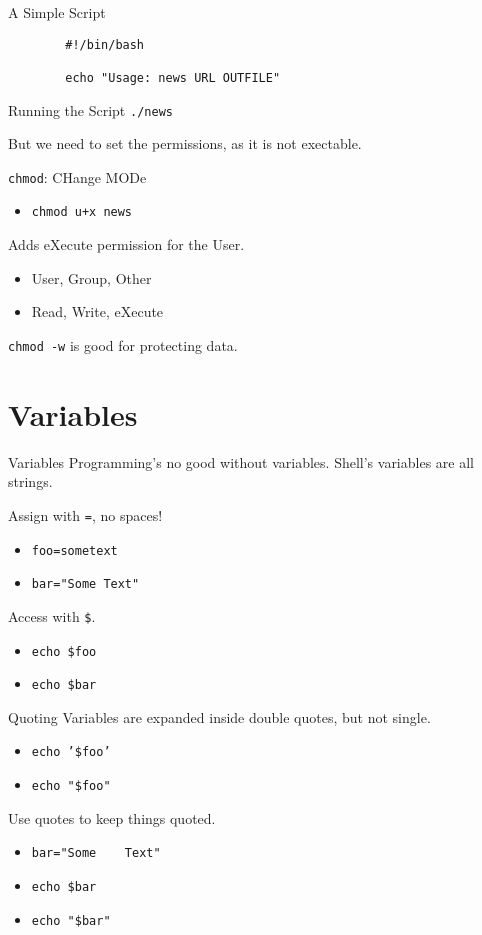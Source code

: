 \documentclass[pdf,usenames,dvipsnames,14pt]{beamer}%
\newcommand\hyphen{\char`\-}
\begin{document}
\begin{frame}[fragile]{A Simple Script}
	\begin{verbatim}
		#!/bin/bash
		
		echo "Usage: news URL OUTFILE"
	\end{verbatim}
\end{frame}

\begin{frame}{Running the Script}
	\texttt{./news}
	
	But we need to set the permissions, as it is not exectable.
	
	\texttt{chmod}: CHange MODe
	\begin{itemize}
		\item \texttt{chmod u+x news}
	\end{itemize}
	Adds eXecute permission for the User.
	\begin{itemize}
		\item User, Group, Other
		\item Read, Write, eXecute
	\end{itemize}
	\texttt{chmod -w} is good for protecting data.
	\note{
		\texttt{ls \hyphen l}
	}
\end{frame}

\section{Variables}

\begin{frame}{Variables}
	Programming's no good without variables.
	Shell's variables are all strings.
	
	Assign with \texttt{=}, no spaces!
	\begin{itemize}
		\item \texttt{foo=sometext}
		\item \texttt{bar="Some Text"}
	\end{itemize}
	Access with \texttt{\$}.
	\begin{itemize}
		\item \texttt{echo \$foo}
		\item \texttt{echo \$bar}
	\end{itemize}
\end{frame}

\begin{frame}{Quoting}
	Variables are expanded inside double quotes, but not single.
	\begin{itemize}
		\item \texttt{echo '\$foo'}
		\item \texttt{echo "\$foo"}
	\end{itemize}
	Use quotes to keep things quoted.
	\begin{itemize}
		\item \texttt{bar="Some\ \ \ \ Text"}
		\item \texttt{echo \$bar}
		\item \texttt{echo "\$bar"}
	\end{itemize}
\end{frame}
\end{document}
